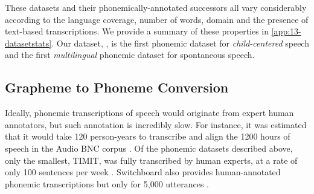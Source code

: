 %
These datasets and their phonemically-annotated successors all vary considerably according to the language coverage, number of words, domain and the presence of text-based transcriptions. We provide a summary of these properties in \cref{app:13-datasetstats}. Our dataset, \ipachildes, is the first phonemic dataset for \emph{child-centered} speech and the first \emph{multilingual} phonemic dataset for spontaneous speech.%

\subsection{Grapheme to Phoneme Conversion}

Ideally, phonemic transcriptions of speech would originate from expert human annotators, but such annotation is incredibly slow. For instance, it was estimated that it would take 120 person-years to transcribe and align the 1200 hours of speech in the Audio BNC corpus \citep{coleman2011mining}. Of the phonemic datasets described above, only the smallest, TIMIT, was fully transcribed by human experts, at a rate of only 100 sentences per week \citep{zue1996transcription, lamel1989speech}. Switchboard also provides human-annotated phonemic transcriptions but only for 5,000 utterances \citep{greenberg1996insights}.

